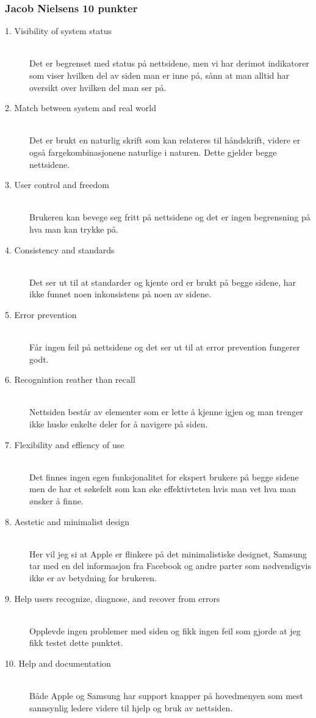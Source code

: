 \documentclass[a4paper, 10pt]{article}
\begin{document}
\subsubsection{Jacob Nielsens 10 punkter}

\begin{description}
  \item[1. Visibility of system status] \hfill \\
    Det er begrenset med status på nettsidene, men vi har derimot indikatorer som viser hvilken del av siden man er inne på, sånn at man alltid har oversikt over hvilken del man ser på.
  \item[2. Match between system and real world] \hfill \\
     Det er brukt en naturlig skrift som kan relateres til håndskrift, videre er også fargekombinasjonene naturlige i naturen. Dette gjelder begge nettsidene. 
  \item[3. User control and freedom] \hfill \\
     Brukeren kan bevege seg fritt på nettsidene og det er ingen begrensning på hva man kan trykke på. 
  \item[4. Consistency and standards] \hfill \\
    Det ser ut til at standarder og kjente ord er brukt på begge sidene, har ikke funnet noen inkonsistens på noen av sidene.      
  \item[5. Error prevention] \hfill \\
    Får ingen feil på nettsidene og det ser ut til at error prevention fungerer godt. 
  \item[6. Recognintion reather than recall] \hfill \\
  Nettsiden består av elementer som er lette å kjenne igjen og man trenger ikke huske enkelte deler for å navigere på siden. 
  \item[7. Flexibility and effiency of use] \hfill \\
     Det finnes ingen egen funksjonalitet for ekspert brukere på begge sidene men de har et søkefelt som kan øke effektivteten hvis man vet hva man ønsker å finne. 
  \item[8. Aestetic and minimalist design] \hfill \\
    Her vil jeg si at Apple er flinkere på det minimalistiske designet, Samsung tar med en del informasjon fra Facebook og andre parter som nødvendigvis ikke er av betydning for brukeren. 
  \item[9. Help users recognize, diagnose, and recover from errors] \hfill \\
      Opplevde ingen problemer med siden og fikk ingen feil som gjorde at jeg fikk testet dette punktet. 
  \item[10. Help and documentation] \hfill \\
    Både Apple og Samsung har support knapper på hovedmenyen som mest sannsynlig ledere videre til hjelp og bruk av nettsiden. 
\end{description}
\end{document}
